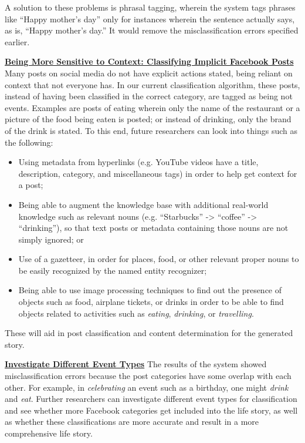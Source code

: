 A solution to these problems is phrasal tagging, wherein the system tags phrases like ``Happy mother's day” only for instances wherein the sentence actually says, as is, ``Happy mother's day.” It would remove the misclassification errors specified earlier. 

\underline{\textbf{Being More Sensitive to Context: Classifying Implicit Facebook Posts}} \newline
Many posts on social media do not have explicit actions stated, being reliant on context that not everyone has. In our current classification algorithm, these posts, instead of having been classified in the correct category, are tagged as being not events. Examples are posts of eating wherein only the name of the restaurant or a picture of the food being eaten is posted; or instead of drinking, only the brand of the drink is stated. To this end, future researchers can look into things such as the following:
\begin{itemize}
	\item Using metadata from hyperlinks (e.g. YouTube videos have a title, description, category, and miscellaneous tags) in order to help get context for a post; \cite{DBLP:conf/ecir/KinsellaPB11}
	\item Being able to augment the knowledge base with additional real-world knowledge such as relevant nouns (e.g. ``Starbucks” -> ``coffee” -> ``drinking”), so that text posts or metadata containing those nouns are not simply ignored; or 
	\item Use of a gazetteer, in order for places, food, or other relevant proper nouns to be easily recognized by the named entity recognizer;
	\item Being able to use image processing techniques to find out the presence of objects such as food, airplane tickets, or drinks in order to be able to find objects related to activities such as \textit{eating}, \textit{drinking}, or \textit{travelling}.
\end{itemize}
These will aid in post classification and content determination for the generated story.

\underline{\textbf{Investigate Different Event Types}} \newline
The results of the system showed misclassification errors because the post categories have some overlap with each other. For example, in \textit{celebrating} an event such as a birthday, one might \textit{drink} and \textit{eat}. Further researchers can investigate different event types for classification and see whether more Facebook categories get included into the life story, as well as whether these classifications are more accurate and result in a more comprehensive life story.

